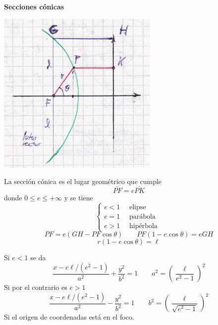 \documentclass[10pt,oneside]{CBFT_book}
\begin{document}
\begin{ejemplo}{\bf Secciones cónicas}
 
\includegraphics[scale=0.3]{images/fig_mc_secciones_conicas.jpg} 
 
La sección cónica es el lugar geométrico que cumple 
\[
	\bar{PF} = e \bar{PK}
\]
donde $0 \leq e \leq +\infty$ y se tiene
\[
	\begin{cases}
	e < 1 \quad \text{ elipse } \\
	e = 1 \quad \text{ parábola } \\
	e > 1 \quad \text{ hipérbola }
	\end{cases}
\]
\[
	PF = e (GH - PF \cos\theta ) \qquad PF(1-e\cos\theta) = e GH
\]
\[
	r(1-e\cos\theta)=\ell
\]

Si $e<1$ se da
\[
	\frac{ x - e\ell/(e^2-1)}{a^2} + \frac{y^2}{b^2}= 1 \qquad a^2 = \left( \frac{\ell}{e^2-1} \right)^2 
\]
Si por el contrario es $e>1$
\[
	\frac{ x - e\ell/(e^2-1)}{a^2} - \frac{y^2}{b^2}= 1 \qquad b^2 = \left( \frac{\ell}{\sqrt{e^2-1}} \right)^2 
\]
Si el origen de coordenadas está en el foco.
\end{ejemplo}
\end{document}
